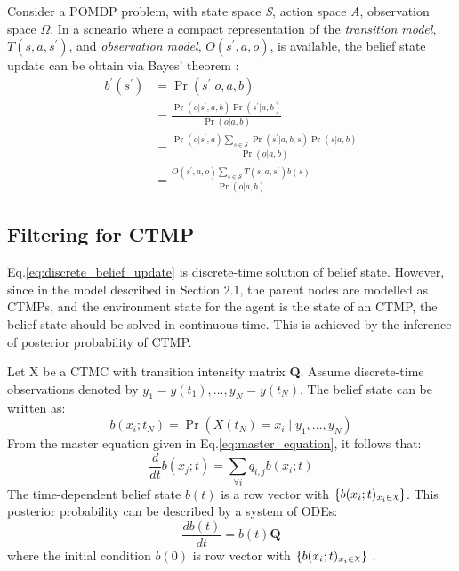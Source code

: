 Consider a POMDP problem, with state space \textit{S}, action space \textit{A}, observation space $ \Omega $. In a scneario where a compact representation of the \textit{transition model}, $ T(s, a, s^{\prime})$,  and \textit{observation model}, $ O(s^{\prime}, a, o) $, is available, the belief state update can be obtain via Bayes' theorem \cite{Kaelbling2011}:
\begin{align}
b^{\prime}\left(s^{\prime}\right) &=\operatorname{Pr}\left(s^{\prime} | o, a, b\right) \nonumber\\
&=\frac{\operatorname{Pr}\left(o | s^{\prime}, a, b\right) \operatorname{Pr}\left(s^{\prime} | a, b\right)}{\operatorname{Pr}(o | a, b)} \nonumber\\
&=\frac{\operatorname{Pr}\left(o | s^{\prime}, a\right) \sum_{s \in \mathcal{S}} \operatorname{Pr}\left(s^{\prime} | a, b, s\right) \operatorname{Pr}(s | a, b)}{\operatorname{Pr}(o | a, b)} \nonumber\\
&=\frac{O\left(s^{\prime}, a, o\right) \sum_{s \in \mathcal{S}} T\left(s,a, s^{\prime}\right) b(s)}{\operatorname{Pr}(o | a, b)}
\label{eq:discrete_belief_update}
\end{align}

\subsection{Filtering for CTMP}
Eq.\ref{eq:discrete_belief_update} is discrete-time solution of belief state. However, since in the model described in Section 2.1, the parent nodes are modelled as CTMPs, and the environment state for the agent is the state of an CTMP, the belief state should be solved in continuous-time. This is achieved by the inference of posterior probability of CTMP.

Let X be a CTMC with transition intensity matrix \textbf{Q}. Assume discrete-time observations denoted by $ y_{1}=y(t_{1}), ..., y_{N}=y(t_{N}) $. The belief state can be written as:
\begin{equation}
	b(x_{i};t_{N}) = \operatorname{Pr}(X(t_{N}) = x_{i} \mid y_{1}, ..., y_{N})
\end{equation}
From the master equation given in Eq.\ref{eq:master_equation}, it follows that:
\begin{equation}
 \frac{d}{dt} b(x_{j};t)  = \sum_{\forall i} q_{i,j} b(x_{i};t)
\end{equation}
The time-dependent belief state $ b(t) $ is a row vector with $ \left\lbrace b(x_{i};t)_{x_{i} \in \rchi}\right\rbrace  $.
This posterior probability can be described by a system of ODEs:
\begin{equation}
\frac{db(t)}{dt} = b(t)\textbf{Q}
\end{equation}
where the initial condition $ b(0) $ is row vector with $ \left\lbrace b(x_{i};t)_{x_{i} \in \rchi}\right\rbrace $ \cite{article}.

